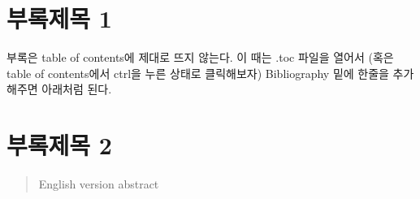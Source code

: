 \documentclass[ko,indentfirst,twoside,ms]{snuthesis_utf8}
\begin{document}
\begin{bibpage}
	
	
\end{bibpage}

\appendix
\chapter{부록제목 1}
부록은 table of contents에 제대로 뜨지 않는다.
이 때는 .toc 파일을 열어서 (혹은 table of contents에서 ctrl을 누른 상태로 클릭해보자) Bibliography 밑에 한줄을 추가해주면 아래처럼 된다.



\chapter{부록제목 2}


\begin{abstract}
English version abstract
\end{abstract}
\end{document}
